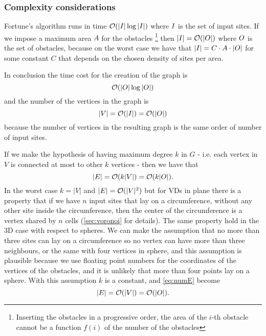 \documentclass[dissertation.tex]{subfiles}
\begin{document}
\subsubsection{Complexity considerations}
Fortune's algorithm runs in time $\mathcal{O}(|I|\log |I|)$ \cite{deberg}
where $I$ is
the set 
of input sites. If we impose a maximum area $A$ for the obstacles
\footnote{Inserting the obstacles in a progressive order, the area of the $i$-th
obstacle cannot be a function $f(i)$ of the number of
the obstacles} then $|I|=\mathcal{O}(|O|)$ where $O$ is the set of
obstacles, because on the worst case we have that $|I|=C\cdot A\cdot
|O|$ for
some constant $C$ that depends on the chosen density of sites per area.

In conclusion the time cost for the creation of the graph
is
\newcommand{\eqCostGraph}{\ensuremath{\bigO(|\obsSet|\log |\obsSet|)}}
\begin{equation}
  \label{eq:costGraph}
  \eqCostGraph
\end{equation}
and the number of the vertices in the graph
is 
\begin{equation}
  \label{eq:numV}
  |V|=\mathcal{O}(|I|)=\mathcal{O}(|O|)
\end{equation}
because the number of vertices in the resulting graph is the
same order of number of input sites.

If we make the hypothesis of having maximum degree $k$ in $G$ -
i.e. each vertex in $V$ is connected at most to other $k$ vertices -
then we have that
\begin{equation}
  \label{eq:numE}
  |E|=\mathcal{O}(k|V|)=\mathcal{O}(k|O|).
\end{equation}
In the worst case $k=|V|$ and $|E|=\mathcal{O}(|V|^2)$ but for \acp{VD} in
plane there is a property that if we have $n$ input sites
that lay on a circumference, without any other site inside the
circumference, then the center of the circumference is a vertex shared
by $n$ cells (\cref{sec:voronoi} for details). The same property hold
in the 3D case with respect to spheres. We can make the assumption that no more than three sites can lay
on a circumference so no vertex can have more than three neighbours,
or the same with four vertices in sphere, and this assumption is
plausible because we use floating point numbers for the coordinates of
the vertices of the obstacles, and it is unlikely that more than
four points lay on a sphere. With this assumption $k$ is a constant,
and \cref{eq:numE} become
\begin{equation*}
  |E|=\mathcal{O}(|V|)=\mathcal{O}(|O|).
\end{equation*}
\end{document}
